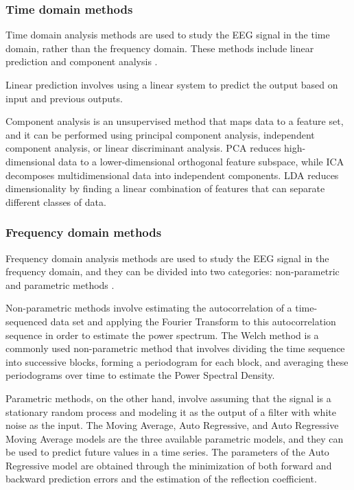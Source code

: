 \subsubsection{Time domain methods}
Time domain analysis methods are used to study the \gls{EEG} signal in the time domain, rather than the frequency domain. These methods include linear prediction and component analysis \cite{acharya_automated_2013}. 

Linear prediction involves using a linear system to predict the output based on input and previous outputs.

Component analysis is an unsupervised method that maps data to a feature set, and it can be performed using principal component analysis, independent component analysis, or linear discriminant analysis. 
\gls{PCA} reduces high-dimensional data to a lower-dimensional orthogonal feature subspace, while \gls{ICA} decomposes multidimensional data into independent components. 
\gls{LDA} reduces dimensionality by finding a linear combination of features that can separate different classes of data. 

\subsubsection{Frequency domain methods}
Frequency domain analysis methods are used to study the \gls{EEG} signal in the frequency domain, and they can be divided into two categories: non-parametric and parametric methods \cite{acharya_automated_2013}.

Non-parametric methods involve estimating the autocorrelation of a time-sequenced data set and applying the Fourier Transform to this autocorrelation sequence in order to estimate the power spectrum. 
The Welch method is a commonly used non-parametric method that involves dividing the time sequence into successive blocks, forming a periodogram for each block, and averaging these periodograms over time to estimate the Power Spectral Density. 

Parametric methods, on the other hand, involve assuming that the signal is a stationary random process and modeling it as the output of a filter with white noise as the input. 
The Moving Average, Auto Regressive, and Auto Regressive Moving Average models are the three available parametric models, and they can be used to predict future values in a time series. The parameters of the Auto Regressive model are obtained through the minimization of both forward and backward prediction errors and the estimation of the reflection coefficient.

